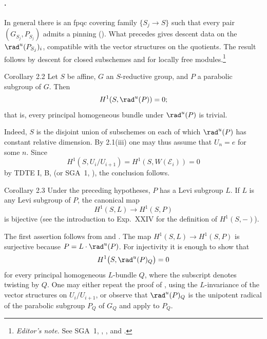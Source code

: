 \paragraph{.}
In general there is an fpqc covering family \(\{S_j\to S\}\) such that
every pair \((G_{S_j},P_{S_j})\) admits a pinning ().  What precedes
gives descent data on the \(\rad^u(P_{S_j})_i\), compatible with the
vector structures on the quotients.  The result follows by descent for
closed subschemes and for locally free modules.\footnote{\emph{Editor's
note.} See SGA~1, , , and .}

\begin{sgastatement}{Corollary 2.2}
Let \(S\) be affine, \(G\) an \(S\)-reductive group, and \(P\) a parabolic
subgroup of \(G\).  Then
\[
 H^1(S,\rad^u(P))=0;
\]
that is, every principal homogeneous bundle under \(\rad^u(P)\) is
trivial.
\end{sgastatement}

Indeed, \(S\) is the disjoint union of subschemes on each of which
\(\rad^u(P)\) has constant relative dimension.  By 2.1(iii) one may thus
assume that \(U_n=e\) for some \(n\).  Since
\[
 H^1(S,U_i/U_{i+1})
 =H^1(S,W(\mathcal E_i))=0
\]
by TDTE I, B,  (or SGA~1, ), the conclusion follows.

\begin{sgastatement}{Corollary 2.3}
Under the preceding hypotheses, \(P\) has a Levi subgroup \(L\).  If
\(L\) is any Levi subgroup of \(P\), the canonical map
\[
 H^1(S,L)\longrightarrow H^1(S,P)
\]
is bijective \textup{(see the introduction to Exp.\ XXIV for the
definition of \(H^1(S,-)\))}.
\end{sgastatement}

The first assertion follows from  and .  The map
\(H^1(S,L)\to H^1(S,P)\) is surjective because
\(P=L\cdot\rad^u(P)\).  For injectivity it is enough to show that
\[
 H^1\bigl(S,\rad^u(P)_Q\bigr)=0
\]
for every principal homogeneous \(L\)-bundle \(Q\), where the subscript
denotes twisting by \(Q\).  One may either repeat the proof of , using
the \(L\)-invariance of the vector structures on \(U_i/U_{i+1}\), or
observe that \(\rad^u(P)_Q\) is the unipotent radical of the parabolic
subgroup \(P_Q\) of \(G_Q\) and apply  to \(P_Q\).

